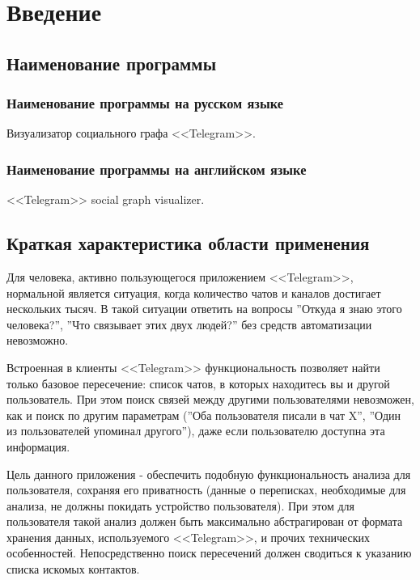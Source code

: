 \section{Введение}

\subsection{Наименование программы}

\subsubsection{Наименование программы на русском языке}

Визуализатор социального графа <<Telegram>>.

\subsubsection{Наименование программы на английском языке}

<<Telegram>> social graph visualizer.

\subsection{Краткая характеристика области применения}

Для человека, активно пользующегося приложением <<Telegram>>, нормальной является ситуация, когда количество чатов и каналов достигает нескольких тысяч.
В такой ситуации ответить на вопросы ''Откуда я знаю этого человека?'', ''Что связывает этих двух людей?'' без средств автоматизации невозможно.

Встроенная в клиенты <<Telegram>> функциональность позволяет найти только базовое пересечение: список чатов, в которых находитесь вы и другой пользователь.
При этом поиск связей между другими пользователями невозможен, как и поиск по другим параметрам (''Оба пользователя писали в чат X'', ''Один из пользователей упоминал другого''), даже если пользователю доступна эта информация.

Цель данного приложения - обеспечить подобную функциональность анализа для пользователя, сохраняя его приватность (данные о переписках, необходимые для анализа, не должны покидать устройство пользователя).
При этом для пользователя такой анализ должен быть максимально абстрагирован от формата хранения данных, используемого <<Telegram>>, и прочих технических особенностей. Непосредственно поиск пересечений должен сводиться к указанию списка искомых контактов.